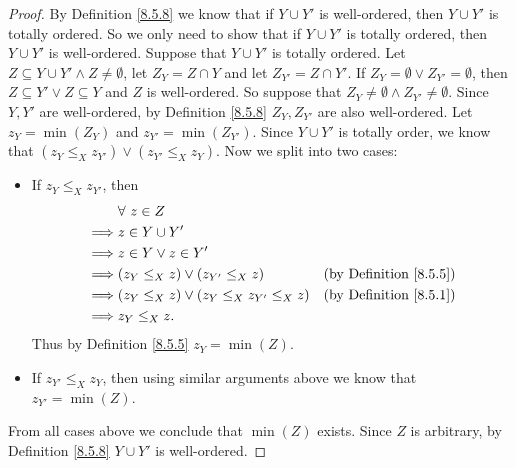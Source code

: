 \begin{proof}
    By Definition \ref{8.5.8} we know that if \(Y \cup Y'\) is well-ordered, then \(Y \cup Y'\) is totally ordered.
    So we only need to show that if \(Y \cup Y'\) is totally ordered, then \(Y \cup Y'\) is well-ordered.
    Suppose that \(Y \cup Y'\) is totally ordered.
    Let \(Z \subseteq Y \cup Y' \land Z \neq \emptyset\), let \(Z_Y = Z \cap Y\) and let \(Z_{Y'} = Z \cap Y'\).
    If \(Z_Y = \emptyset \lor Z_{Y'} = \emptyset\), then \(Z \subseteq Y' \lor Z \subseteq Y\) and \(Z\) is well-ordered.
    So suppose that \(Z_Y \neq \emptyset \land Z_{Y'} \neq \emptyset\).
    Since \(Y, Y'\) are well-ordered, by Definition \ref{8.5.8} \(Z_Y, Z_{Y'}\) are also well-ordered.
    Let \(z_Y = \min(Z_Y)\) and \(z_{Y'} = \min(Z_{Y'})\).
    Since \(Y \cup Y'\) is totally order, we know that \((z_Y \leq_X z_{Y'}) \lor (z_{Y'} \leq_X z_Y)\).
    Now we split into two cases:
    \begin{itemize}
        \item If \(z_Y \leq_X z_{Y'}\), then
              \begin{align*}
                           & \forall\ z \in Z                                                                      \\
                  \implies & z \in Y \cup Y'                                                                       \\
                  \implies & z \in Y \lor z \in Y'                                                                 \\
                  \implies & (z_Y \leq_X z) \lor (z_{Y'} \leq_X z)            & \text{(by Definition \ref{8.5.5})} \\
                  \implies & (z_Y \leq_X z) \lor (z_Y \leq_X z_{Y'} \leq_X z) & \text{(by Definition \ref{8.5.1})} \\
                  \implies & z_Y \leq_X z.
              \end{align*}
              Thus by Definition \ref{8.5.5} \(z_Y = \min(Z)\).
        \item If \(z_{Y'} \leq_X z_Y\), then using similar arguments above we know that \(z_{Y'} = \min(Z)\).
    \end{itemize}
    From all cases above we conclude that \(\min(Z)\) exists.
    Since \(Z\) is arbitrary, by Definition \ref{8.5.8} \(Y \cup Y'\) is well-ordered.
\end{proof}

